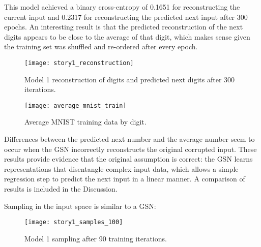 This model achieved a binary cross-entropy of 0.1651 for reconstructing the current input  and 0.2317 for reconstructing the predicted next input after 300 epochs. An interesting result is that the predicted reconstruction of the next digits appears to be close to the average of that digit, which makes sense given the training set was shuffled and re-ordered after every epoch.

\begin{figure}[h!]
  \centering
    \texttt{[image: story1\_reconstruction]}
\caption{Model 1 reconstruction of digits and predicted next digits after 300 iterations.}
\end{figure}

\begin{figure}[h!]
  \centering
    \texttt{[image: average\_mnist\_train]}
\caption{Average MNIST training data by digit.}
\end{figure}

Differences between the predicted next number and the average number seem to occur when the GSN incorrectly reconstructs the original corrupted input. These results provide evidence that the original assumption is correct: the GSN learns representations that disentangle complex input data, which allows a simple regression step to predict the next input in a linear manner. A comparison of results is included in the Discussion.

Sampling in the input space is similar to a GSN:
\begin{figure}[h!]
  \centering
    \texttt{[image: story1\_samples\_100]}
\caption{Model 1 sampling after 90 training iterations.}
\end{figure}
